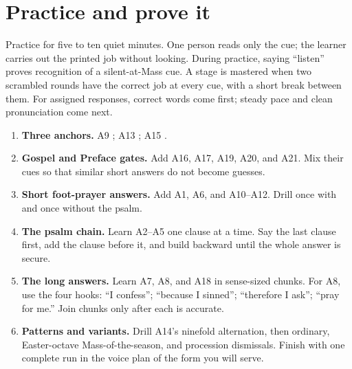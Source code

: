 \PrintMassOrderVoiceMap

\section{Practice and prove it}

Practice for five to ten quiet minutes. One person reads only the cue; the
learner carries out the printed job without looking. During practice, saying
``listen'' proves recognition of a silent-at-Mass cue. A stage is mastered
when two scrambled rounds have the correct job at every cue, with a short
break between them. For assigned responses, correct words come first; steady
pace and clean pronunciation come next.

\begin{enumerate}[leftmargin=1.6em,label=\textbf{Stage \arabic*:}]
\item \textbf{Three anchors.}  A9 ; A13
  ; A15 .
  \par{}
\item \textbf{Gospel and Preface gates.}  Add A16, A17, A19, A20, and A21.
  Mix their cues so that similar short answers do not become guesses.
  \par{}
\item \textbf{Short foot-prayer answers.}  Add A1, A6, and A10--A12.
  Drill once with and once without the psalm.
  \par{}
\item \textbf{The psalm chain.}  Learn A2--A5 one clause at a time.  Say the
  last clause first, add the clause before it, and build backward until the
  whole answer is secure.
  \par{}
\item \textbf{The long answers.}  Learn A7, A8, and A18 in sense-sized chunks.
  For A8, use the four hooks: ``I confess''; ``because I sinned''; ``therefore
  I ask''; ``pray for me.''  Join chunks only after each is accurate.
  \par{}
\item \textbf{Patterns and variants.}  Drill A14's ninefold alternation, then
  ordinary, Easter-octave Mass-of-the-season, and procession dismissals. Finish with
  one complete run in the voice plan of the form you will serve.
  \par{}
\end{enumerate}

